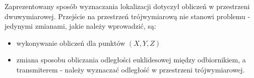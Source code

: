 Zaprezentowany sposób wyznaczania lokalizacji dotyczył obliczeń w przestrzeni dwuwymiarowej. Przejście na przestrzeń trójwymiarową nie stanowi problemu - jedynymi zmianami, jakie należy wprowadzić, są:
\begin{itemize}
	\item wykonywanie obliczeń dla punktów $(X,Y,Z)$
	\item zmiana sposobu obliczania odległości euklidesowej między odbiornikiem, a transmiterem - należy wyznaczać odległość w przestrzeni trójwymiarowej.
\end{itemize}
